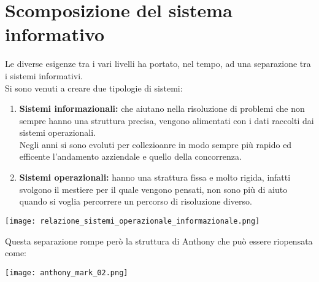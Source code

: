 \documentclass[../main.tex]{subfiles}
\begin{document}
	\section{Scomposizione del sistema informativo}
	Le diverse esigenze tra i  vari livelli ha portato, nel tempo, ad una separazione tra i sistemi informativi.\\
	Si sono venuti a creare due tipologie di sistemi:
	\begin{enumerate}
		\item \textbf{Sistemi informazionali:} che aiutano nella risoluzione di problemi che non sempre hanno una struttura precisa, vengono alimentati con i dati raccolti dai sistemi operazionali.\\
			Negli anni si sono evoluti per collezioanre in modo sempre più rapido ed efficente l'andamento azziendale e quello della concorrenza.
		\item \textbf{Sistemi operazionali:} hanno una strattura fissa e molto rigida, infatti svolgono il mestiere per il quale vengono pensati, non sono più di aiuto quando si voglia percorrere un percorso di risoluzione diverso.
	\end{enumerate}
	\begin{center}
		\texttt{[image: relazione\_sistemi\_operazionale\_informazionale.png]}
	\end{center}
	Questa separazione rompe però la struttura di Anthony che può essere riopensata come:
	\begin{center}
		\texttt{[image: anthony\_mark\_02.png]}
	\end{center}
\end{document}
